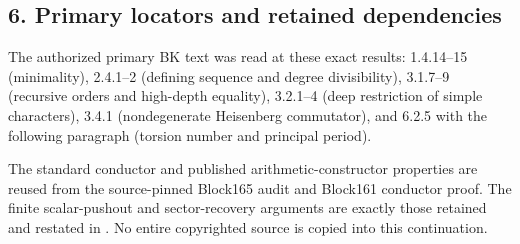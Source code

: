 \hypertarget{odd_capacity-primary-locators-and-retained-dependencies}{%
\subsection{6. Primary locators and retained
dependencies}\label{odd_capacity-primary-locators-and-retained-dependencies}}

The authorized primary BK text was read at these exact results:
1.4.14--15 (minimality), 2.4.1--2 (defining sequence and degree
divisibility), 3.1.7--9 (recursive orders and high-depth equality),
3.2.1--4 (deep restriction of simple characters), 3.4.1 (nondegenerate
Heisenberg commutator), and 6.2.5 with the following paragraph (torsion
number and principal period).

The standard conductor and published arithmetic-constructor properties
are reused from the source-pinned Block165 audit and Block161 conductor
proof. The finite scalar-pushout and sector-recovery arguments are
exactly those retained and restated in
. No entire copyrighted source is
copied into this continuation.
